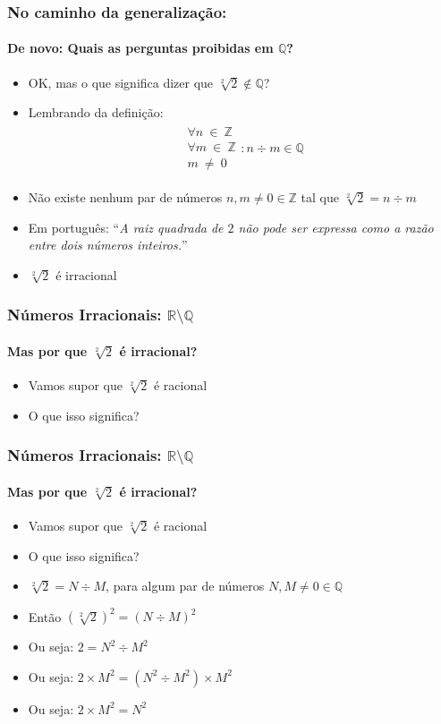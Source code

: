 \documentclass[usenames,dvipsnames,svgnames]{beamer}
\begin{document}
\begin{frame}	
	\frametitle{No caminho da generalização:}
	\framesubtitle{De novo: Quais as perguntas proibidas em $\mathbb{Q}$?}

	\begin{itemize}
		\item OK, mas o que significa dizer que $\sqrt[2]{2} \not\in \mathbb{Q}$?
		\item Lembrando da definição:
		\begin{equation}
		\begin{aligned}
			\substack{\forall n ~\in~ \mathbb{Z} \\ \forall m ~\in~ \mathbb{Z} \\ m ~\neq~ 0}: n \div m \in \mathbb{Q}
		\end{aligned}
		\end{equation}
		\item Não existe nenhum par de números $n,m \neq 0 \in \mathbb{Z}$ tal que $\sqrt[2]{2} = n \div m$
		\item Em português: ``\emph{A raiz quadrada de $2$ não pode ser expressa como a {\color{red}razão} entre dois números inteiros.}''
		\item $\sqrt[2]{2}$ é {\color{red}irracional}
	\end{itemize}
\end{frame}

\begin{frame}	
	\frametitle{Números Irracionais: $\mathbb{R} \setminus \mathbb{Q}$}
	\framesubtitle{Mas {\color{red}por que} $\sqrt[2]{2}$ é irracional?}

	\begin{itemize}
		\item Vamos supor que $\sqrt[2]{2}$ é racional
		\item O que isso significa?
	\end{itemize}
\end{frame}

\begin{frame}	
	\frametitle{Números Irracionais: $\mathbb{R} \setminus \mathbb{Q}$}
	\framesubtitle{Mas {\color{red}por que} $\sqrt[2]{2}$ é irracional?}

	\begin{itemize}
		\item Vamos supor que $\sqrt[2]{2}$ é racional
		\item O que isso significa?
		\item $\sqrt[2]{2} = N \div M$, para algum par de números $N,M \neq 0 \in \mathbb{Q}$
		\item Então ${(\sqrt[2]{2})}^2 = {(N \div M)}^2$
		\item Ou seja: $2 = N^2 \div M^2$
		\item Ou seja: $2 \times M^2 = (N^2 \div M^2) \times M^2$
		\item Ou seja: $2 \times M^2 = N^2$
	\end{itemize}
\end{frame}
\end{document}
